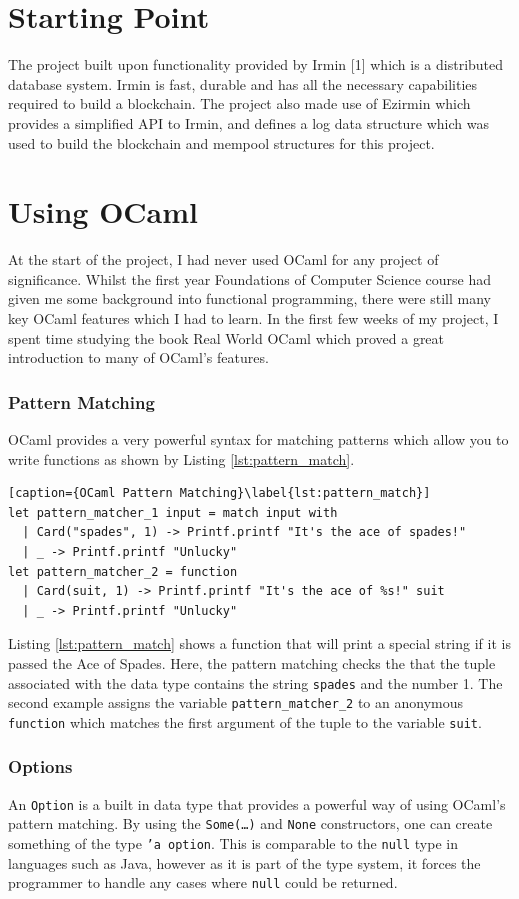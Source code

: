 \documentclass[12pt,a4paper,twoside,openright]{report}
\begin{document}
	\section{Starting Point}
	The project built upon functionality provided by Irmin [1] which is a distributed database system.  Irmin is fast, durable and has all the necessary capabilities required to build a blockchain.
	The project also made use of Ezirmin \cite{Ezirmin} which provides a simplified API to Irmin, and defines a log data structure which was used to build the blockchain and mempool structures for this project.

	\section{Using OCaml}
	At the start of the project, I had never used OCaml for any project of significance. 
	Whilst the first year Foundations of Computer Science course had given me some background into functional programming, there were still many key OCaml features which I had to learn.
	In the first few weeks of my project, I spent time studying the book Real World OCaml \cite{RealWorldOCaml} which proved a great introduction to many of OCaml's features.  

	\subsubsection*{Pattern Matching}
	OCaml provides a very powerful syntax for matching patterns which allow you to write functions as shown by Listing \ref{lst:pattern_match}.
	\begin{lstlisting}[caption={OCaml Pattern Matching}\label{lst:pattern_match}]
let pattern_matcher_1 input = match input with
  | Card("spades", 1) -> Printf.printf "It's the ace of spades!"
  | _ -> Printf.printf "Unlucky"
let pattern_matcher_2 = function
  | Card(suit, 1) -> Printf.printf "It's the ace of %s!" suit
  | _ -> Printf.printf "Unlucky"
	\end{lstlisting}
	Listing \ref{lst:pattern_match} shows a function that will print a special string if it is passed the Ace of Spades. 
	Here, the pattern matching checks the that the tuple associated with the data type contains the string \texttt{spades} and the number 1.
	The second example assigns the variable \texttt{pattern\_matcher\_2} to an anonymous \texttt{function} which matches the first argument of the tuple to the variable \texttt{suit}.
	\subsubsection*{Options}
	An \texttt{Option} is a built in data type that provides a powerful way of using OCaml's pattern matching.
	By using the \texttt{Some(\ldots)} and \texttt{None} constructors, one can create something of the type \texttt{'a option}. 
	This is comparable to the \texttt{null} type in languages such as Java, however as it is part of the type system, it forces the programmer to handle any cases where \texttt{null} could be returned.
\end{document}
